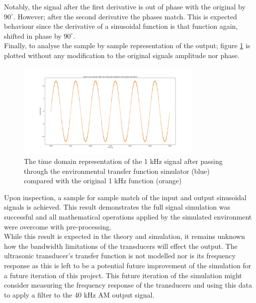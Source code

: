 Notably, the signal after the first derivative is out of phase with the original by $90^\circ$. However; after the second derivative the phases match. This is expected behaviour since the derivative of a sinusoidal function is that function again, shifted in phase by $90^\circ$.\\
Finally, to analyse the sample by sample representation of the output; figure \ref{fig:youtfinal} is plotted without any modification to the original signals amplitude nor phase.
\begin{figure}[ht!]
    \centering
    \includegraphics[width=0.8\textwidth]{Figures/SigSimulation/youtfulldemod.png}
    \caption{The time domain representation of the 1 kHz signal after passing through the environmental transfer function simulator (blue) compared with the original 1 kHz function (orange)}
    \label{fig:youtfinal}
\end{figure}
\newpage
Upon inspection, a sample for sample match of the input and output sinusoidal signals is achieved. This result demonstrates the full signal simulation was successful and all mathematical operations applied by the simulated environment were overcome with pre-processing.\\
While this result is expected in the theory and simulation, it remains unknown how the bandwidth limitations of the transducers will effect the output. The ultrasonic transducer's transfer function is not modelled nor is its frequency response as this is left to be a potential future improvement of the simulation for a future iteration of this project. This future iteration of the simulation might consider measuring the frequency response of the transducers and using this data to apply a filter to the 40 kHz AM output signal.
